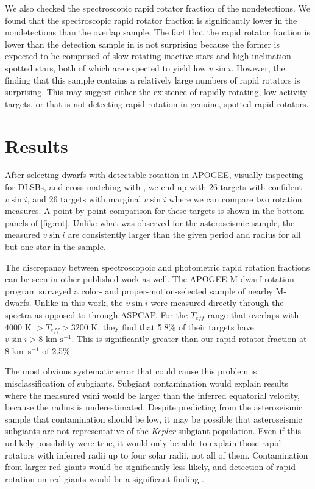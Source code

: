 \documentclass[manuscript]{aastex6}
\newcommand{\vsini}{\ensuremath{v \sin i}}
\newcommand{\Kepler}{\mbox{\textit{Kepler}}}
\newcommand{\Teff}{\ensuremath{T_{eff}}}
\newcommand{\kms}{\textrm{ km~s}\ensuremath{^{-1}}}
\begin{document}
We also checked the spectroscopic rapid rotator fraction of the 
\citet{McQuillan14} nondetections. We found that the spectroscopic rapid 
rotator fraction is significantly
lower in the nondetections than the overlap sample. The fact that the
rapid rotator fraction is lower than the detection sample in
\citet{McQuillan14} is not surprising because the former is expected to be 
comprised of slow-rotating inactive stars and high-inclination spotted stars, 
both of which are expected to yield low \vsini{}. However, the finding that 
this sample contains a relatively large numbers of rapid rotators is
surprising. This may suggest either the existence of rapidly-rotating,
low-activity targets, or that \citet{McQuillan14} is not detecting rapid
rotation in genuine, spotted rapid rotators.

\section{Results}
\label{sec:results}

After selecting dwarfs with detectable rotation in APOGEE,
visually inspecting for DLSBs, and cross-matching with \citet{McQuillan14}, we 
end up with 26 targets with confident \vsini{}, and 26 targets with marginal
\vsini{} where we can compare two rotation measures. A point-by-point
comparison for these targets is shown in the bottom panels of
\cref{fig:rot}. Unlike what was observed for the
asteroseismic sample, the measured \vsini{} are consistently larger than the 
given period and radius for all but one star in the sample.

The discrepancy between spectroscopoic and photometric rapid rotation fractions
can be seen in other published work as well. The APOGEE M-dwarf rotation
program \citep{Gilhool18} surveyed a color- and proper-motion-selected sample
of nearby M-dwarfs. Unlike in this work, the \vsini{} were measured directly
through the spectra as opposed to through ASPCAP\@. For the \Teff{} range that
overlaps with \citet{McQuillan14} \(4000 \textrm{ K } > \Teff > 3200\) K, they 
find that 5.8\% of their targets have \(\vsini > 8 \kms\). This is 
significantly greater than our rapid rotator fraction at 8 \kms{} of 2.5\%. 

The most obvious systematic error that could cause this problem is
misclassification of subgiants. Subgiant contamination would explain 
results where the measured vsini would be
larger than the inferred equatorial velocity, because the radius is
underestimated. Despite predicting from the asteroseismic sample that
contamination should be low, it may be possible that asteroseismic subgiants
are not representative of the \Kepler{} subgiant population. Even if this
unlikely possibility were true, it would only be able to explain those rapid
rotators with inferred radii up to four solar radii, not all of them.
Contamination from larger red giants would be significantly less likely, and
detection of rapid rotation on red giants would be a significant finding
\citep{Tayar15}.
\end{document}
